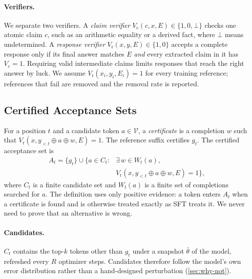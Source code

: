 \documentclass{article}
\newcommand{\vocab}{\mathcal{V}}
\newcommand{\acc}{A}
\theoremstyle{plain}
\theoremstyle{remark}
\begin{document}
\paragraph{Verifiers.} We separate two verifiers. A \emph{claim verifier} $V_{\mathrm{c}}(c,x,E)\in\{1,0,\bot\}$ checks one atomic claim $c$, such as an arithmetic equality or a derived fact, where $\bot$ means undetermined. A \emph{response verifier} $V_{\mathrm{r}}(x,y,E)\in\{1,0\}$ accepts a complete response only if its final answer matches $E$ \emph{and} every extracted claim in it has $V_{\mathrm{c}}=1$. Requiring valid intermediate claims limits responses that reach the right answer by luck. We assume $V_{\mathrm{r}}(x_i,y_i,E_i)=1$ for every training reference; references that fail are removed and the removal rate is reported.

\subsection{Certified Acceptance Sets}
\label{sec:acceptance}
For a position $t$ and a candidate token $a\in\vocab$, a \emph{certificate} is a completion $w$ such that $V_{\mathrm{r}}(x, y_{<t}\oplus a\oplus w, E)=1$. The reference suffix certifies $g_t$. The certified acceptance set is
\begin{equation}
\begin{aligned}
 \acc_t=\{g_t\}\cup\{a\in C_t :{}& \exists\, w\in W_t(a),\\
 &V_{\mathrm{r}}(x,y_{<t}\oplus a\oplus w,E)=1\},
\end{aligned}
 \label{eq:acceptance}
\end{equation}
where $C_t$ is a finite candidate set and $W_t(a)$ is a finite set of completions searched for $a$. The definition uses only positive evidence: a token enters $\acc_t$ when a certificate is found and is otherwise treated exactly as SFT treats it. We never need to prove that an alternative is wrong.

\paragraph{Candidates.} $C_t$ contains the top-$k$ tokens other than $g_t$ under a snapshot $\bar\theta$ of the model, refreshed every $R$ optimizer steps. Candidates therefore follow the model's own error distribution rather than a hand-designed perturbation (\cref{sec:why-not}).
\end{document}
